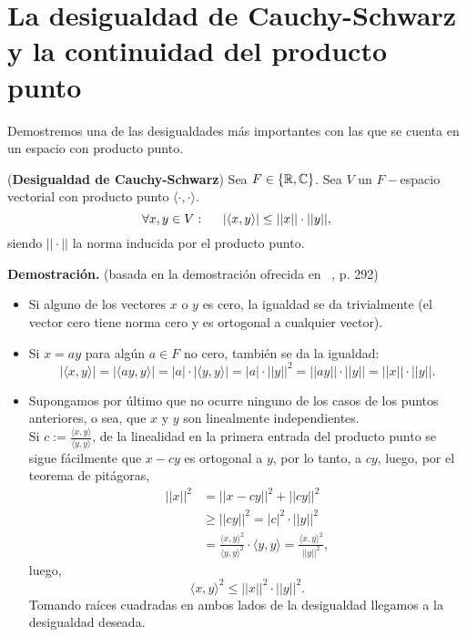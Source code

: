 \section{La desigualdad de Cauchy-Schwarz y la continuidad del producto punto}
\noindent Demostremos 
una de las desigualdades
más importantes con las que se cuenta en un espacio
con producto punto.

\begin{teo}
(\textbf{Desigualdad de Cauchy-Schwarz}) \label{Teo:CauchySchwarz}
Sea $F \in \{ \mathbb{R}, \mathbb{C} \}$.
Sea $V$ un $F-$espacio vectorial con producto punto 
$ \langle \cdot  , \cdot  \rangle$.
\begin{equation}
\label{eq0: 12Feb}
\forall x , y \in V : \hspace{0.5cm}
|\langle x , y \rangle | \leq ||x|| \cdot ||y||,
\end{equation}
siendo $|| \cdot ||$
la norma inducida por el producto punto.
\end{teo}
\noindent
\textbf{Demostración.}
(basada en la demostración
ofrecida en ~\cite{Lang}, p. 292)
\begin{itemize}
\item Si alguno de los vectores $x$ o $y$ es cero,
la igualdad se da trivialmente (el vector cero tiene norma
cero y es ortogonal a cualquier vector). 

\item Si $x=a y$ para algún $a \in F$ no cero, también se 
da la igualdad:
\[
|\langle  x , y \rangle | =
|\langle  ay , y \rangle | = |a| \cdot  |\langle  y , y \rangle | =  
 |a| \cdot ||y||^{2}
=||ay|| \cdot ||y|| = ||x|| \cdot ||y||.
\]
\item Supongamos por último que no ocurre ninguno
de los casos de los puntos anteriores, o sea, que
$x$ y $y$ son linealmente independientes. \\
Si $c:=\frac{\langle x , y \rangle}{\langle y , y \rangle}$,
de la linealidad en la primera entrada
del producto punto se sigue fácilmente que
$x - cy$ es ortogonal a $y$, por lo tanto, a $cy$,
luego, 
por el teorema de pitágoras,
\begin{align*}
||x||^{2} & = ||x-cy||^{2} + ||cy||^{2} \\
& \geq ||cy||^{2}= |c|^{2} \cdot ||y||^{2} \\
& = \frac{\langle x , y \rangle ^{2}}{\langle y , y \rangle ^{2}} \cdot\langle y , y \rangle
= \frac{\langle x , y \rangle ^{2}}{|| y ||^{2}},
\end{align*}
luego, 
\[
\langle x, y \rangle ^{2}  \leq ||x||^{2} \cdot ||y||^{2}.
\]
Tomando raíces cuadradas en ambos lados de la
desigualdad llegamos a la desigualdad deseada. \QEDB
\end{itemize}
\vspace{0.2cm}


